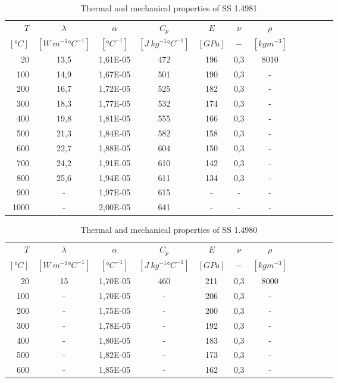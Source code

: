 \begin{table}\centering
    \begin{tabular}{@{}rccccccccccc@{}}\toprule
    $T$ & $\lambda$ & $\alpha$ & $C_p$ & $E$ & $\nu$ & $\rho$\\
    \cmidrule{1-7}
    $[\si{\degree} C]$ & $[W \ m^{-1} \si{\degree} C^{-1}]$ & $[\si{\degree} C^{-1}]$ & $[J \ kg^{-1} \si{\degree} C^{-1}]$ & $[GPa]$ & $-$ & $[kg m^{-3}]$\\
    \midrule
    20 & 13,5 & 1,61E-05 & 472 & 196 & 0,3 & 8010 \\
    100 & 14,9 & 1,67E-05 & 501 & 190 & 0,3 & - \\
    200 & 16,7 & 1,72E-05 & 525 & 182 & 0,3 & - \\
    300 & 18,3 & 1,77E-05 & 532 & 174 & 0,3 & - \\
    400 & 19,8 & 1,81E-05 & 555 & 166 & 0,3 & - \\
    500 & 21,3 & 1,84E-05 & 582 & 158 & 0,3 & - \\
    600 & 22,7 & 1,88E-05 & 604 & 150 & 0,3 & - \\
    700 & 24,2 & 1,91E-05 & 610 & 142 & 0,3 & - \\
    800 & 25,6 & 1,94E-05 & 611 & 134 & 0,3 & - \\
    900 & - & 1,97E-05 & 615 & - & - & - \\
    1000 & - & 2,00E-05 & 641 & - & - & - \\
\bottomrule
\end{tabular}
\caption{Thermal and mechanical properties of \acrlong{SS} 1.4981}
\end{table}

\begin{table}\centering
    \begin{tabular}{@{}rccccccccccc@{}}\toprule
    $T$ & $\lambda$ & $\alpha$ & $C_p$ & $E$ & $\nu$ & $\rho$\\
    \cmidrule{1-7}
    $[\si{\degree} C]$ & $[W \ m^{-1} \si{\degree} C^{-1}]$ & $[\si{\degree} C^{-1}]$ & $[J \ kg^{-1} \si{\degree} C^{-1}]$ & $[GPa]$ & $-$ & $[kg m^{-3}]$\\
    \midrule
    20 & 15 & 1,70E-05 & 460 & 211 & 0,3 & 8000 \\
    100 & - & 1,70E-05 & - & 206 & 0,3 & - \\
    200 & - & 1,75E-05 & - & 200 & 0,3 & - \\
    300 & - & 1,78E-05 & - & 192 & 0,3 & - \\
    400 & - & 1,80E-05 & - & 183 & 0,3 & - \\
    500 & - & 1,82E-05 & - & 173 & 0,3 & - \\
    600 & - & 1,85E-05 & - & 162 & 0,3 & - \\
\bottomrule
\end{tabular}
\caption{Thermal and mechanical properties of \acrlong{SS} 1.4980}
\end{table}

